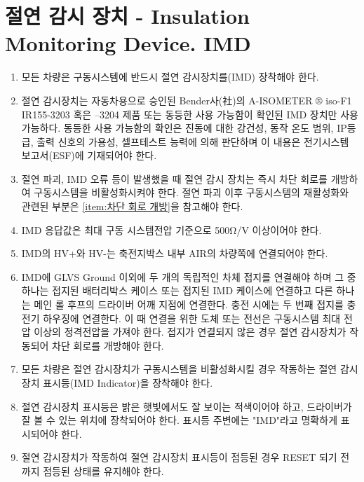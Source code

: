 \documentclass[final,a4paper,10pt]{report}
\begin{document}
\section{절연 감시 장치 - Insulation Monitoring Device. IMD}\label{rule:formula-technical.insulation-monitoring-device}
\begin{enumerate}
  \item\label{rule:formula-technical.insulation-monitoring-device.mandatory-installation} 모든 차량은 구동시스템에 반드시 절연 감시장치를(IMD) 장착해야 한다.
  \item\label{rule:formula-technical.insulation-monitoring-device.approved-model-or-equivalent} 절연 감시장치는 자동차용으로 승인된 Bender사({社})의 A-ISOMETER ® iso-F1 IR155-3203 혹은 –3204 제품 또는 동등한 사용 가능함이 확인된 IMD 장치만 사용 가능하다. 동등한 사용 가능함의 확인은 진동에 대한 강건성, 동작 온도 범위, IP등급, 출력 신호의 가용성, 셀프테스트 능력에 의해 판단하며 이 내용은 전기시스템 보고서(ESF)에 기재되어야 한다.
  \item\label{rule:formula-technical.insulation-monitoring-device.opens-sdc-on-fault} 절연 파괴, IMD 오류 등이 발생했을 때 절연 감시 장치는 즉시 차단 회로를 개방하여 구동시스템을 비활성화시켜야 한다. 절연 파괴 이후 구동시스템의 재활성화와 관련된 부분은 \ref{item:차단 회로 개방}을 참고해야 한다.
  \item\label{rule:formula-technical.insulation-monitoring-device.min-500ohm-per-volt} IMD 응답값은 최대 구동 시스템전압 기준으로 500Ω/V 이상이어야 한다.
  \item\label{rule:formula-technical.insulation-monitoring-device.hv-terminals-downstream-air} IMD의 HV+와 HV-는 축전지박스 내부 AIR의 차량쪽에 연결되어야 한다.
  \item\label{rule:formula-technical.insulation-monitoring-device.dual-chassis-ground-connections} IMD에 GLVS Ground 이외에 두 개의 독립적인 차체 접지를 연결해야 하며 그 중 하나는 접지된 배터리박스 케이스 또는 접지된 IMD 케이스에 연결하고 다른 하나는 메인 롤 후프의 드라이버 어깨 지점에 연결한다. {\color{blue}충전 시에는 두 번째 접지를 충전기 하우징에 연결한다.} 이 때 연결을 위한 도체 또는 전선은 구동시스템 최대 전압 이상의 정격전압을 가져야 한다. 접지가 연결되지 않은 경우 절연 감시장치가 작동되어 차단 회로를 개방해야 한다.
  \item\label{rule:formula-technical.insulation-monitoring-device.imd-indicator-light} 모든 차량은 절연 감시장치가 구동시스템을 비활성화시킬 경우 작동하는 절연 감시장치 표시등(IMD Indicator)을 장착해야 한다.
  \item\label{rule:formula-technical.insulation-monitoring-device.red-visible-imd-labeled} 절연 감시장치 표시등은 밝은 햇빛에서도 잘 보이는 적색이어야 하고, 드라이버가 잘 볼 수 있는 위치에 장착되어야 한다. 표시등 주변에는 "IMD"라고 명확하게 표시되어야 한다.
  \item\label{rule:formula-technical.insulation-monitoring-device.indicator-latched-until-reset} 절연 감시장치가 작동하여 절연 감시장치 표시등이 점등된 경우 RESET 되기 전까지 점등된 상태를 유지해야 한다.
\end{enumerate}
\end{document}
